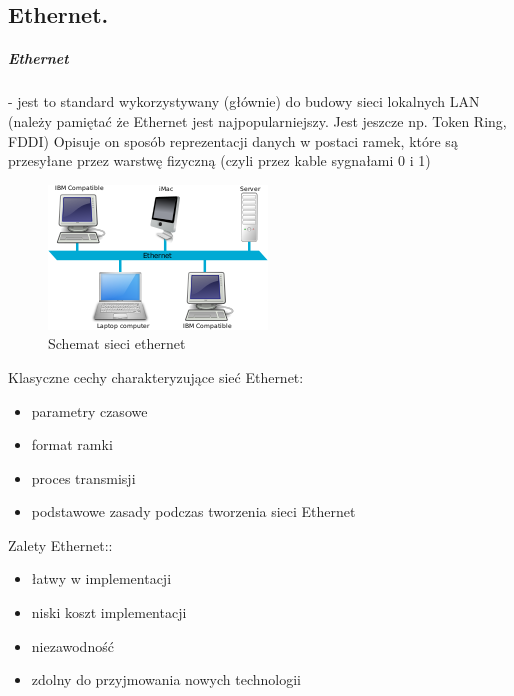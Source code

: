 \documentclass[a4paper,12pt,oneside]{book}
\begin{document}
			\newpage\subsection{Ethernet.}
				\subparagraph{Ethernet} - jest to standard wykorzystywany (głównie) do budowy sieci lokalnych LAN
				(należy pamiętać że Ethernet jest najpopularniejszy. Jest jeszcze np. Token Ring, FDDI)
				Opisuje on sposób reprezentacji danych w postaci ramek, które są przesyłane przez
				warstwę fizyczną (czyli przez kable sygnałami 0 i 1)
				
				\begin{figure}[h!]
					\centering\includegraphics[scale=0.45]{ethernet.png}
					\caption{Schemat sieci ethernet}
				\end{figure}
				
				Klasyczne cechy charakteryzujące sieć Ethernet:
				\begin{itemize}
					\item parametry czasowe
					\item format ramki
					\item proces transmisji
					\item podstawowe zasady podczas tworzenia sieci Ethernet
				\end{itemize}
			
				Zalety Ethernet::
				\begin{itemize}
					\item łatwy w implementacji
					\item niski koszt implementacji
					\item niezawodność
					\item zdolny do przyjmowania nowych technologii
				\end{itemize}
			
\end{document}
